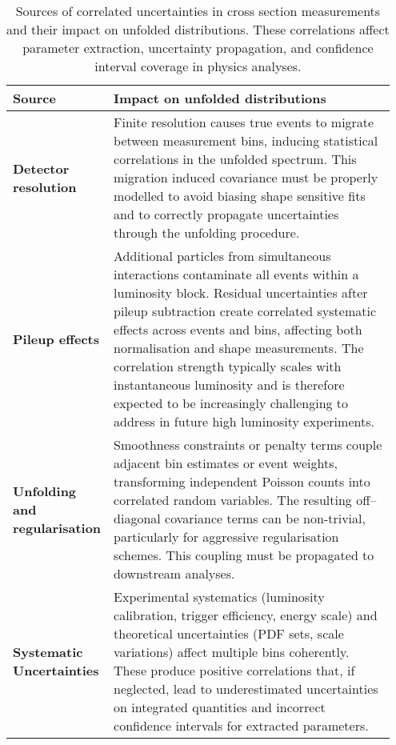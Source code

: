 \begin{table}
    \centering
    \caption[Sources of correlated uncertainties in cross section measurements]{Sources of correlated uncertainties in cross section measurements and their impact on unfolded distributions. 
    These correlations affect parameter extraction, uncertainty propagation, and confidence interval coverage in physics analyses.}
    \label{tab:correlations}
    \begin{tabular}{p{0.18\linewidth} p{0.77\linewidth}}
        \toprule
        \textbf{Source} & \textbf{Impact on unfolded distributions} \\
        \midrule
        \textbf{Detector resolution} & 
        Finite resolution causes true events to migrate between measurement bins, inducing statistical correlations in the unfolded spectrum. 
        This migration induced covariance must be properly modelled to avoid biasing shape sensitive fits and to correctly propagate uncertainties through the unfolding procedure. \\
        
        \textbf{Pileup effects} & 
        Additional particles from simultaneous interactions contaminate all events within a luminosity block. 
        Residual uncertainties after pileup subtraction create correlated systematic effects across events and bins, affecting both normalisation and shape measurements. 
        The correlation strength typically scales with instantaneous luminosity and is therefore expected to be increasingly challenging to address in future high luminosity experiments. \\
        
        \textbf{Unfolding and regularisation} & 
        Smoothness constraints or penalty terms couple adjacent bin estimates or event weights, transforming independent Poisson counts into correlated random variables. 
        The resulting off--diagonal covariance terms can be non-trivial, particularly for aggressive regularisation schemes. 
        This coupling must be propagated to downstream analyses. \\
        
        \textbf{Systematic Uncertainties} & 
        Experimental systematics (luminosity calibration, trigger efficiency, energy scale) and theoretical uncertainties (PDF sets, scale variations) affect multiple bins coherently. 
        These produce positive correlations that, if neglected, lead to underestimated uncertainties on integrated quantities and incorrect confidence intervals for extracted parameters. \\
        \bottomrule
    \end{tabular}
\end{table}